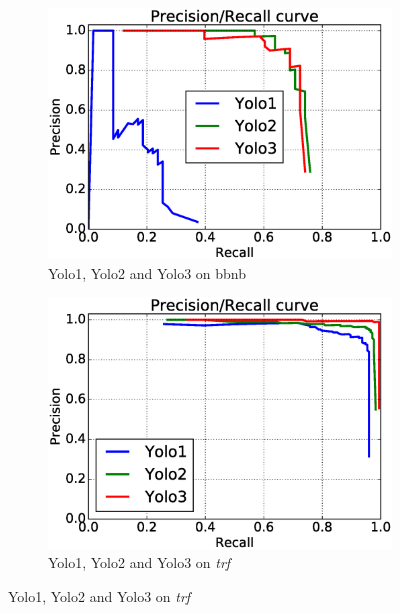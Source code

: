 \begin{figure}[h!]
\begin{subfigure}{.5\textwidth}
  \centering
  \includegraphics[width=0.8\linewidth]{results/case_tr_moor/prec_recall/bb.eps}
  \caption{Yolo1, Yolo2 and Yolo3 on bbnb}
  \label{fig:moor_bb}
\end{subfigure}%
\begin{subfigure}{.5\textwidth}
  \centering
  \includegraphics[width=.8\linewidth]{results/case_tr_moor/prec_recall/trf.eps}
  \caption{Yolo1, Yolo2 and Yolo3 on \textit{trf}}
  \label{fig:moor_trf}
\end{subfigure}


\end{figure}
